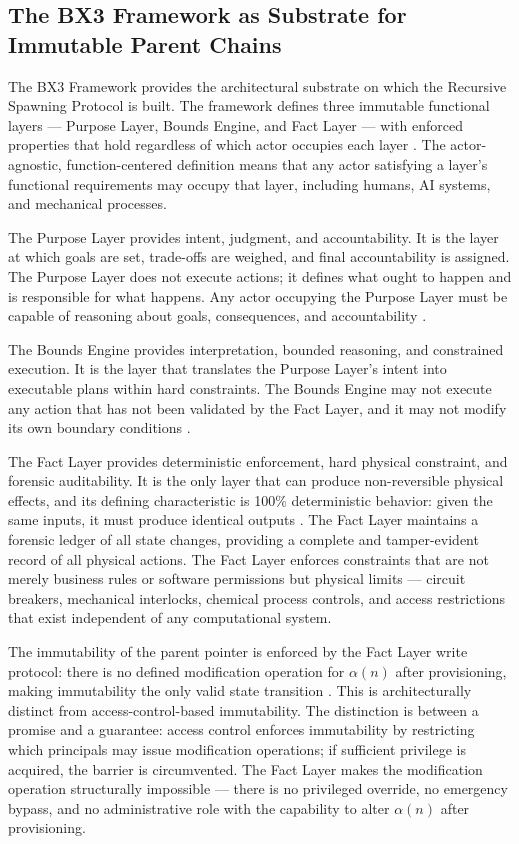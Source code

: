 \subsection{The BX3 Framework as Substrate for Immutable Parent Chains}
\label{sec:bx3-substrate}

The BX3 Framework provides the architectural substrate on which the Recursive Spawning Protocol is built. The framework defines three immutable functional layers --- Purpose Layer, Bounds Engine, and Fact Layer --- with enforced properties that hold regardless of which actor occupies each layer \cite{bx3whitepaper2026}. The actor-agnostic, function-centered definition means that any actor satisfying a layer's functional requirements may occupy that layer, including humans, AI systems, and mechanical processes.

The Purpose Layer provides intent, judgment, and accountability. It is the layer at which goals are set, trade-offs are weighed, and final accountability is assigned. The Purpose Layer does not execute actions; it defines what ought to happen and is responsible for what happens. Any actor occupying the Purpose Layer must be capable of reasoning about goals, consequences, and accountability \cite{bx3whitepaper2026}.

The Bounds Engine provides interpretation, bounded reasoning, and constrained execution. It is the layer that translates the Purpose Layer's intent into executable plans within hard constraints. The Bounds Engine may not execute any action that has not been validated by the Fact Layer, and it may not modify its own boundary conditions \cite{bx3whitepaper2026}.

The Fact Layer provides deterministic enforcement, hard physical constraint, and forensic auditability. It is the only layer that can produce non-reversible physical effects, and its defining characteristic is 100\% deterministic behavior: given the same inputs, it must produce identical outputs \cite{bx3whitepaper2026}. The Fact Layer maintains a forensic ledger of all state changes, providing a complete and tamper-evident record of all physical actions. The Fact Layer enforces constraints that are not merely business rules or software permissions but physical limits --- circuit breakers, mechanical interlocks, chemical process controls, and access restrictions that exist independent of any computational system.

The immutability of the parent pointer is enforced by the Fact Layer write protocol: there is no defined modification operation for $\alpha(n)$ after provisioning, making immutability the only valid state transition \cite{bx3whitepaper2026}. This is architecturally distinct from access-control-based immutability. The distinction is between a promise and a guarantee: access control enforces immutability by restricting which principals may issue modification operations; if sufficient privilege is acquired, the barrier is circumvented. The Fact Layer makes the modification operation structurally impossible --- there is no privileged override, no emergency bypass, and no administrative role with the capability to alter $\alpha(n)$ after provisioning.

